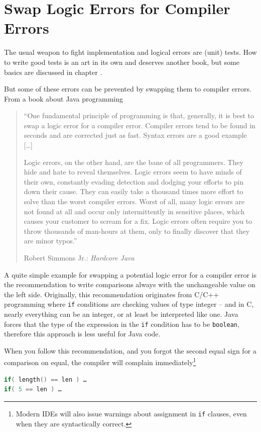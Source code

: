 \section{Swap Logic Errors for Compiler Errors}\label{sec:SwapToCompilerErrors}
The usual weapon to fight implementation and logical errors are (unit) tests. How to write good tests is an art in its own and deserves another book, but some basics are discussed in chapter .

But some of these errors can be prevented by swapping them to compiler errors. From a book about Java programming
\begin{quote}
“One fundamental principle of programming is that, generally, it is best to swap a logic error for a compiler error. Compiler errors tend to be found in seconds and are corrected just as fast. Syntax errors are a good example […]

Logic errors, on the other hand, are the bane of all programmers. They hide and hate to reveal themselves. Logic errors seem to have minds of their own, constantly evading detection and dodging your efforts to pin down their cause. They can easily take a thousand times more effort to solve than the worst compiler errors. Worst of all, many logic errors are not found at all and occur only intermittently in sensitive places, which causes your customer to scream for a fix. Logic errors often require you to throw thousands of man-hours at them, only to finally discover that they are minor typos.”

Robert Simmons Jr.: \textit{Hardcore Java} \autocite{Simmons:HARDCORE_JAVA}
\end{quote}

A quite simple example for swapping a potential logic error for a compiler error is the recommendation to write comparisons always with the unchangeable value on the left side. Originally, this recommendation originates from C/C++ programming where \lstinline|if| conditions are checking values of type integer – and in C, nearly everything can be an integer, or at least be interpreted like one. Java forces that the type of the expression in the \lstinline|if| condition has to be \lstinline|boolean|, therefore this approach is less useful for Java code. 

When you follow this recommendation, and you forgot the second equal sign for a comparison on equal, the compiler will complain immediately\footnote{Modern IDEs will also issue warnings about assignment in \lstinline|if| clauses, even when they are syntactically correct.}
\begin{lstlisting}[language=C]
if( length() == len ) …
if( 5 == len ) …
\end{lstlisting}

